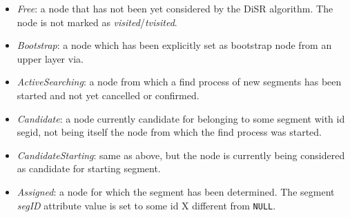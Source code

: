 \begin{itemize}
\item{\emph{Free}}: a node that has  not been yet considered  by the DiSR algorithm.
The node is not marked as \emph{visited}/\emph{tvisited}.
\item{\emph{Bootstrap}}: a node which has been explicitly set as bootstrap node from
an upper layer via. 
\item{\emph{ActiveSearching}}: a node from which a find process of new segments has
been started and not yet cancelled or confirmed. 
\item{\emph{Candidate}}: a node currently candidate for belonging to some segment
with id segid, not being itself the node from which the find process
was started. 

\item{\emph{CandidateStarting}}: same as above, but the node is currently being considered as candidate
for starting segment. 
\item{\emph{Assigned}}: a node for which the segment has been determined.  The
segment \emph{segID} attribute value is set to some id X different from \texttt{NULL}.
\end{itemize}


